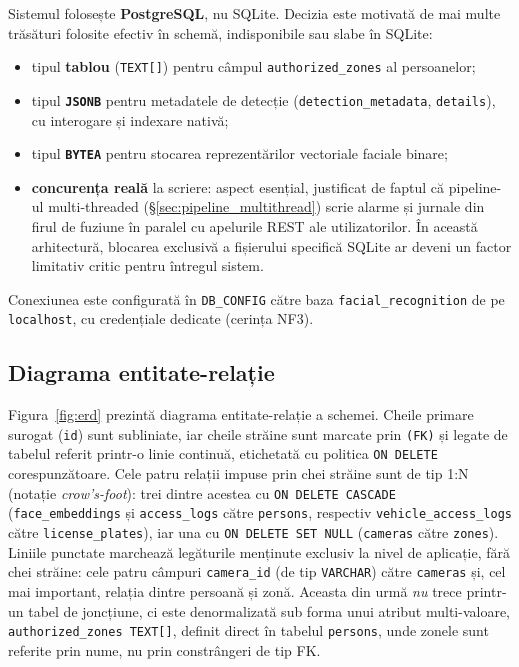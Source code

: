 \documentclass[../../main.tex]{subfiles}
\begin{document}
Sistemul folosește \textbf{PostgreSQL}, nu SQLite. Decizia este motivată de mai multe trăsături folosite efectiv în schemă, indisponibile sau slabe în SQLite:
\begin{itemize}
    \item tipul \textbf{tablou} (\texttt{TEXT[]}) pentru câmpul \texttt{authorized\_zones} al persoanelor;
    \item tipul \textbf{\texttt{JSONB}} pentru metadatele de detecție (\texttt{detection\_metadata}, \linebreak \texttt{details}), cu interogare și indexare nativă;
    \item tipul \textbf{\texttt{BYTEA}} pentru stocarea reprezentărilor vectoriale faciale binare;
    \item \textbf{concurența reală} la scriere: aspect esențial, justificat de faptul că pipeline-ul multi-threaded (\S\ref{sec:pipeline_multithread}) scrie alarme și jurnale din firul de fuziune în paralel cu apelurile REST ale utilizatorilor. În această arhitectură, blocarea exclusivă a fișierului specifică SQLite ar deveni un factor limitativ critic pentru întregul sistem.
\end{itemize}
Conexiunea este configurată în \texttt{DB\_CONFIG} către baza \texttt{facial\_recognition} de pe \texttt{localhost}, cu credențiale dedicate (cerința NF3).

\subsection{Diagrama entitate-relație}

Figura~\ref{fig:erd} prezintă diagrama entitate-relație a schemei. Cheile primare surogat (\texttt{id}) sunt subliniate, iar cheile străine sunt marcate prin \texttt{(FK)} și legate de tabelul referit printr-o linie continuă, etichetată cu politica \texttt{ON DELETE} corespunzătoare. Cele patru relații impuse prin chei străine sunt de tip 1:N (notație \emph{crow's-foot}): trei dintre acestea cu \texttt{ON DELETE CASCADE} (\texttt{face\_embeddings} și \texttt{access\_logs} către \texttt{persons}, respectiv \texttt{vehicle\_access\_logs} către \linebreak \texttt{license\_plates}), iar una cu \texttt{ON DELETE SET NULL} (\texttt{cameras} către \texttt{zones}). Liniile punctate marchează legăturile menținute exclusiv la nivel de aplicație, fără chei străine: cele patru câmpuri \texttt{camera\_id} (de tip \texttt{VARCHAR}) către \texttt{cameras} și, cel mai important, relația dintre persoană și zonă. Aceasta din urmă \emph{nu} trece printr-un tabel de joncțiune, ci este denormalizată sub forma unui atribut multi-valoare, \texttt{authorized\_zones TEXT[]}, definit direct în tabelul \texttt{persons}, unde zonele sunt referite prin nume, nu prin constrângeri de tip FK.
\end{document}
